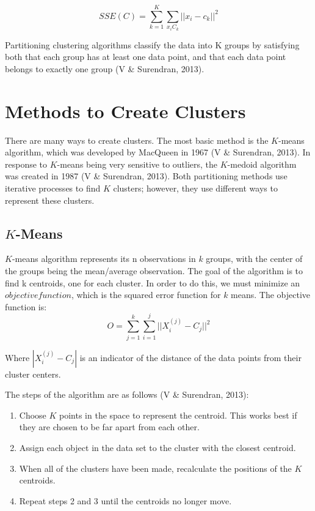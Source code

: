 \documentclass[12pt,twoside]{amherstthesis}
\begin{document}
  \[SSE(C)= \sum_{k=1}^K \sum_{x_{i}C_{k}} ||{x_i}- c_k||^2\]
  
  Partitioning clustering algorithms classify the data into K groups by
  satisfying both that each group has at least one data point, and that
  each data point belongs to exactly one group (V \& Surendran, 2013).
  
  \section{Methods to Create Clusters}\label{methods-to-create-clusters}
  
  There are many ways to create clusters. The most basic method is the
  \(K\)-means algorithm, which was developed by MacQueen in 1967 (V \&
  Surendran, 2013). In response to \(K\)-means being very sensitive to
  outliers, the \(K\)-medoid algorithm was created in 1987 (V \&
  Surendran, 2013). Both partitioning methods use iterative processes to
  find \(K\) clusters; however, they use different ways to represent these
  clusters.
  
  \subsection{\texorpdfstring{\(K\)-Means}{K-Means}}\label{k-means}
  
  \(K\)-means algorithm represents its n observations in \(k\) groups,
  with the center of the groups being the mean/average observation. The
  goal of the algorithm is to find k centroids, one for each cluster. In
  order to do this, we must minimize an \(objective function\), which is
  the squared error function for \(k\) means. The objective function is:
  \[O= \sum_{j=1}^k \sum_{i=1}^j ||{{X_i^{(j)}- C_j}}||^2\]
  
  Where \(|{{X_i^{(j)}- C_j}}|\) is an indicator of the distance of the
  data points from their cluster centers.
  
  The steps of the algorithm are as follows (V \& Surendran, 2013):
  
  \begin{enumerate}
  \def\labelenumi{\arabic{enumi}.}
  \item
    Choose \(K\) points in the space to represent the centroid. This works
    best if they are chosen to be far apart from each other.
  \item
    Assign each object in the data set to the cluster with the closest
    centroid.
  \item
    When all of the clusters have been made, recalculate the positions of
    the \(K\) centroids.
  \item
    Repeat steps 2 and 3 until the centroids no longer move.
  \end{enumerate}
  
\end{document}
